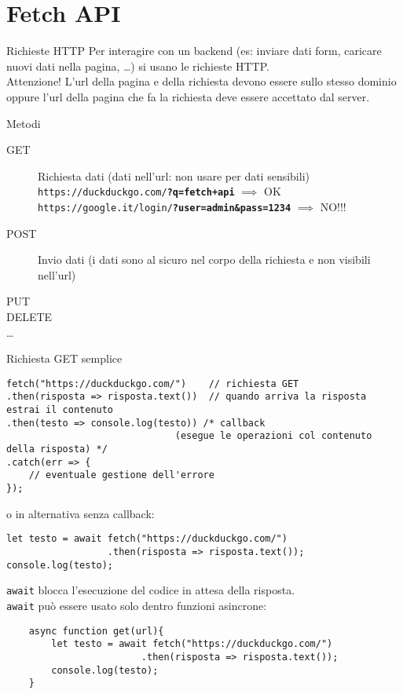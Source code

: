 \section{Fetch API}
\begin{frame}{Richieste HTTP}\transfade\centering
  Per interagire con un backend (es: inviare dati form, caricare nuovi dati nella pagina, \dots) si usano le richieste HTTP.
  \bigskip\\\pause
  \alert{Attenzione!} L'url della pagina e della richiesta devono essere sullo stesso dominio oppure l'url della pagina che fa la richiesta deve essere accettato dal server.
\end{frame}

\begin{frame}{Metodi}\transfade\centering
  \begin{description}
    \item[GET] Richiesta dati (dati nell'url: non usare per dati sensibili)\\\pause
      \texttt{https://duckduckgo.com/\textbf{?q=fetch+api}} $\implies$ OK\\\pause
      \texttt{https://google.it/login/\textbf{?user=admin\&pass=1234}} $\implies$ NO!!!\pause
    \item[POST] Invio dati (i dati sono al sicuro nel corpo della richiesta e non visibili nell'url)\pause
    \item[PUT]
    \item[DELETE]
    \item[\dots]
  \end{description}
\end{frame}

\begin{frame}[fragile]{Richiesta GET semplice}\transfade\centering
  \begin{verbatim}
fetch("https://duckduckgo.com/")    // richiesta GET
.then(risposta => risposta.text())  // quando arriva la risposta estrai il contenuto
.then(testo => console.log(testo)) /* callback
                              (esegue le operazioni col contenuto della risposta) */
.catch(err => {
    // eventuale gestione dell'errore
});
  \end{verbatim}
\bigskip\pause
  o in alternativa senza callback:
  \begin{verbatim}
let testo = await fetch("https://duckduckgo.com/")
                  .then(risposta => risposta.text());
console.log(testo);
  \end{verbatim}
  \smallskip
  \texttt{await} blocca l'esecuzione del codice in attesa della risposta.\\\pause
  \texttt{await} può essere usato solo dentro funzioni asincrone:
  \begin{verbatim}
    async function get(url){
        let testo = await fetch("https://duckduckgo.com/")
                        .then(risposta => risposta.text());
        console.log(testo);
    }
  \end{verbatim}
\end{frame}


